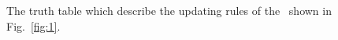 \begin{example}

  \begin{figure}[thpb]
      \centering
      
      \caption{The truth table which describe the updating rules of the \BCN\ shown in Fig.~\ref{fig:1}.}
      \label{fig:2}
   \end{figure}
  
   \label{exa:2}
\end{example}   

